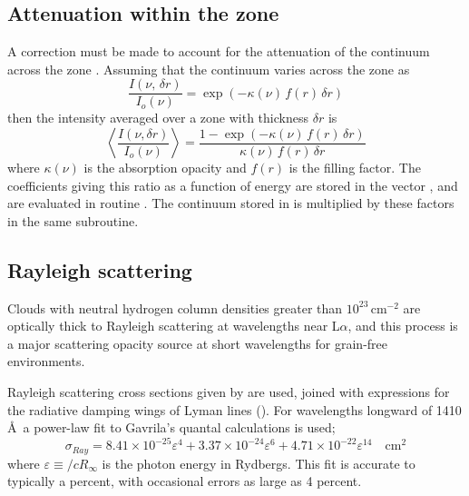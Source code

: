 \subsection{Attenuation within the zone}

A correction must be made to account for the attenuation of the continuum
across the zone \citep{Netzer1984}.
Assuming that the continuum
varies across the zone as
\begin{equation}
\frac{{I(\nu ,\,\delta r)}}{{{I_o}(\nu )}} = \exp \left( { - \kappa \left(
\nu  \right)\,f(r)\,\delta r} \right)%
\end{equation}
then the intensity averaged over a zone with thickness $\delta r$ is
\begin{equation}
\left\langle {\frac{{I\left( {\nu ,\delta r} \right)}}{{{I_o}(\nu )}}}
\right\rangle  = \frac{{1 - \exp \left( { - \kappa \left( \nu
\right)\,f(r)\,\delta r} \right)}}{{\kappa \left( \nu  \right)\,f(r)\,\delta
r}}%
\end{equation}
where $\kappa(\nu)$ is the absorption opacity and $f(r)$ is the filling factor.  The
coefficients giving this ratio as a function of energy are stored in the
vector , and are evaluated in routine .  The continuum stored
in  is multiplied by these factors
in the same subroutine.

\subsection{Rayleigh scattering}

Clouds with neutral hydrogen column densities greater than
$10^{23}\, \mathrm{cm}^{-2}$
are optically thick to Rayleigh scattering at wavelengths near L$\alpha $, and this
process is a major scattering opacity source at short wavelengths for
grain-free environments.

Rayleigh scattering cross sections given by \citet{Gavrila1967} are used,
joined with expressions for the radiative damping wings of Lyman lines
(\citealp{Mihalas1978}).
For wavelengths longward of 1410 \AA\  a power-law fit to
Gavrila's quantal calculations is used;
\begin{equation}
{\sigma _{Ray}} = 8.41 \times {10^{ - 25}}{\varepsilon ^4} + 3.37 \times
{10^{ - 24}}{\varepsilon ^6} + 4.71 \times {10^{ - 22}}{\varepsilon
^{14}}\quad {\mathrm{c}}{{\mathrm{m}}^2}%
\end{equation}
where $\varepsilon \equiv /cR_\infty$ is the photon energy in Rydbergs.  This fit is accurate to
typically a percent, with occasional errors as large as 4 percent.

